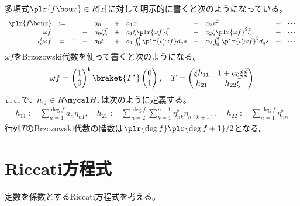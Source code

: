 {	多項式$\plr{f\bou x}\in R[x]$に対して明示的に書くと次のようになっている。
	\begin{equation*}\begin{array}{rclclclclcl}
		\plr{f\bou x} &:=& && a_0 &+& a_1x &+& a_2x^2 &+& \cdots \\
		\omega f &=& 1 &+& a_0\xi\bar{\xi} &+& a_1\xi\plr{\omega f}\bar{\xi} 
			&+& a_2\xi\plr{\omega f}^2\bar{\xi} &+& \cdots \\
		\iota_q^t\omega f &= &1 &+& a_0t 
			&+& a_1\int_0^t\plr{\iota_q^s\omega f}d_qs
			&+& a_2\int_0^t\plr{\iota_q^s\omega f}^2d_qs &+& \cdots \\
	\end{array}\end{equation*}
	$\omega f$をBrzozowski代数を使って書くと次のようになる。
	\begin{equation*}\begin{split}
		\omega f = \pvec{1}{0}^\tran\braket{T^*}\pvec{0}{1}
		,\quad T = \begin{pmatrix}
			\xi h_{11} & 1 + a_0\xi\bar{\xi} \\ h_{21} & h_{22}\bar{\xi}
		\end{pmatrix} \\
	\end{split}\end{equation*}
	ここで、$h_{ij}\in R\Eta_*$は次のように定義する。
	\begin{equation*}\begin{split}
		h_{11} := \sum_{n=1}^{\deg f} a_n\eta_{n1},\quad
		h_{21} := \sum_{n=2}^{\deg f} \sum_{k=1}^{n-1} 
			\eta_{nk}^\flat\eta_{n(k+1)},\quad
		h_{22} := \sum_{n=1}^{\deg f} \eta_{nn}^\flat
	\end{split}\end{equation*}
	行列$T$のBrzozowski代数の階数は$\plr{\deg f}\plr{\deg f+1}/2$となる。

\section{Riccati方程式}\label{s1:Riccati方程式} %
	定数を係数とするRiccati方程式を考える。

}
